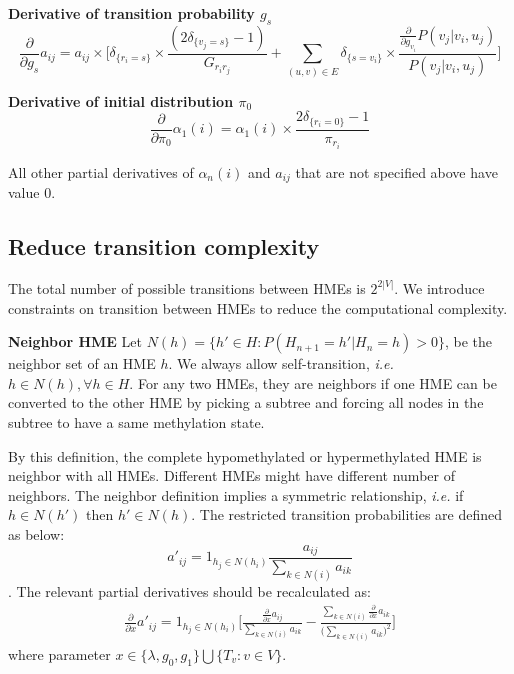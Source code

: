 \documentclass[11pt]{article}
\begin{document}
\noindent\textbf{Derivative of transition probability $g_s$}
\begin{equation*}
\frac{\partial}{\partial g_s}a_{ij} =
a_{ij} \times\big[ \delta_{\{r_i=s\}}\times\frac{(2\delta_{\{v_j=s\}}-1)}{G_{r_ir_j}} + \sum_{(u,v)\in E} \delta_{\{s=v_i\}}\times\frac{\frac{\partial}{\partial g_{v_i}}P(v_j|v_i,u_j)}{P(v_j|v_i,u_j)} \big]
\end{equation*}

\noindent\textbf{Derivative of initial distribution $\pi_0$}
\begin{equation*}
\frac{\partial}{\partial \pi_0}\alpha_1(i) = \alpha_1(i)\times\frac{2\delta_{\{r_i=0\}}-1}{\pi_{r_i}}
\end{equation*}

All other partial derivatives of $\alpha_n(i)$ and $a_{ij}$ that are
not specified above have value 0.

\subsection{Reduce transition complexity}
The total number of possible transitions between HMEs is $2^{2|V|}$. We
introduce constraints on transition between HMEs to reduce the
computational complexity.

\textbf{Neighbor HME} Let $N(h)=\{h'\in H: P(H_{n+1}=h'|H_n=h) > 0\}$,
be the neighbor set of an HME $h$. We always allow self-transition,
\textit{i.e.} $h\in N(h), \forall h\in H$. For any two HMEs, they are
neighbors if one HME can be converted to the other HME by picking a
subtree and forcing all nodes in the subtree to have a same
methylation state.

By this definition, the complete hypomethylated or hypermethylated HME
is neighbor with all HMEs. Different HMEs might have different number
of neighbors.  The neighbor definition implies a symmetric
relationship, \textit{i.e.} if $h\in N(h')$ then $h'\in N(h)$. The
restricted transition probabilities are defined as below:
$$a'_{ij} =1_{h_j\in N(h_i)} \frac{a_{ij}}{\sum_{k\in N(i)} a_{ik}}$$.
The relevant partial derivatives should be recalculated as:
\begin{gather*}
\frac{\partial}{\partial x} a'_{ij} = 1_{h_j\in N(h_i)}
\bigg[ \frac{\frac{\partial}{\partial x} a_{ij}}{\sum_{k\in N(i)} a_{ik}} -
 \frac{\sum_{k\in N(i)}\frac{\partial}{\partial x} a_{ik}}{\big(\sum_{k\in N(i)} a_{ik}\big)^2 }\bigg]
\end{gather*}
where parameter $x\in\{\lambda, g_0, g_1\}\bigcup\{T_v:v\in V\}$.
\end{document}
